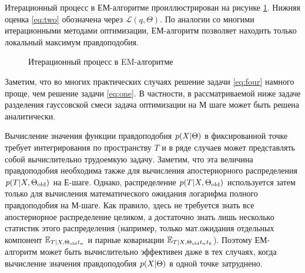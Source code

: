 Итерационный процесс в ЕМ-алгоритме проиллюстрирован на рисунке \ref{fig:three}. Нижняя оценка \eqref{eq:two} обозначена через $\mathcal{L}(q, \Theta)$. По аналогии со многими итерационными методами оптимизации, ЕМ-алгоритм позволяет находить только локальный максимум правдоподобия.
\begin{figure}[H]
	\caption{Итерационный процесс в EM-алгоритме }
	\label{fig:three}
\end{figure}
Заметим, что во многих практических случаях решение задачи \ref{eq:four} намного проще, чем решение задачи \ref{eq:one}. В частности, в рассматриваемой ниже задаче разделения гауссовской смеси задача оптимизации на М шаге может быть решена аналитически.   
      
Вычисление значения функции правдоподобия $p(X \arrowvert \Theta)$ в фиксированной точке требует интегрирования по пространству $T$ и в ряде случаев может представлять собой вычислительно трудоемкую задачу. Заметим, что эта величина правдоподобия необходима также для вычисления апостериорного распределения $p(T \arrowvert X, \Theta_{\text{old}})$ на Е-шаге. Однако, распределение $p(T \arrowvert X, \Theta_{\text{old}})$ используется затем только для вычисления математического ожидания логарифма полного правдоподобия на М-шаге. Как правило, здесь не требуется знать все апостериорное распределение целиком, а достаточно знать лишь несколько статистик этого распределения (например, только мат.ожидания отдельных компонент $\mathbb{E}_{T \arrowvert X, \Theta_{\text{old}} t_n}$ и парные ковариации $\mathbb{E}_{T \arrowvert X, \Theta_{\text{old}} t_n t_k}$). Поэтому ЕМ-алгоритм может быть вычислительно эффективен даже в тех случаях, когда вычисление значения правдоподобия $p(X \arrowvert \Theta)$ в одной точке затруднено.
                  
